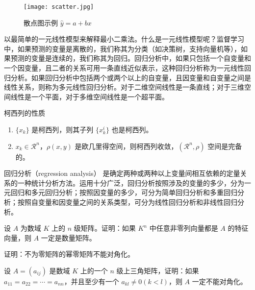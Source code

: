 \documentclass[color=blue,lang=cn,newtx,10pt,scheme=chinese]{elegantbook}
\begin{document}
\begin{figure}[htbp]
  \centering
  \texttt{[image: scatter.jpg]}
  \caption{散点图示例 $\hat{y}=a+bx$ \label{fig:scatter}}
\end{figure}

以最简单的一元线性模型来解释最小二乘法。什么是一元线性模型呢？监督学习中，如果预测的变量是离散的，我们称其为分类（如决策树，支持向量机等），如果预测的变量是连续的，我们称其为回归。回归分析中，如果只包括一个自变量和一个因变量，且二者的关系可用一条直线近似表示，这种回归分析称为一元线性回归分析。如果回归分析中包括两个或两个以上的自变量，且因变量和自变量之间是线性关系，则称为多元线性回归分析。对于二维空间线性是一条直线；对于三维空间线性是一个平面，对于多维空间线性是一个超平面。

\begin{property}\label{property:cauchy}
柯西列的性质
\begin{enumerate}
\item $\{x_k\}$ 是柯西列，则其子列 $\{x_k^i\}$ 也是柯西列。
\item $x_k\in \mathcal{R}^n$，$\rho(x,y)$ 是欧几里得空间，则柯西列收敛，$(\mathcal{R}^n,\rho)$ 空间是完备的。
\end{enumerate}
\end{property}

\begin{conclusion}
回归分析（regression analysis） 是确定两种或两种以上变量间相互依赖的定量关系的一种统计分析方法。运用十分广泛，回归分析按照涉及的变量的多少，分为一元回归和多元回归分析；按照因变量的多少，可分为简单回归分析和多重回归分析；按照自变量和因变量之间的关系类型，可分为线性回归分析和非线性回归分析。
\end{conclusion}

\begin{problemset}
\item 设 $A$ 为数域 $K$ 上的 $n$ 级矩阵。证明：如果 $K^n$ 中任意非零列向量都是 $A$ 的特征向量，则 $A$ 一定是数量矩阵。
\item 证明：不为零矩阵的幂零矩阵不能对角化。
\item 设 $A = (a_{ij})$ 是数域 $K$ 上的一个 $n$ 级上三角矩阵，证明：如果 $a_{11} = a_{22} = \cdots = a_{nn}$，并且至少有一个 $a_{kl} \not = 0 (k < l)$，则 $A$ 一定不能对角化。
\end{problemset}



\nocite{*}

\printbibliography[heading=bibintoc, title=\ebibname]
\appendix
\end{document}
